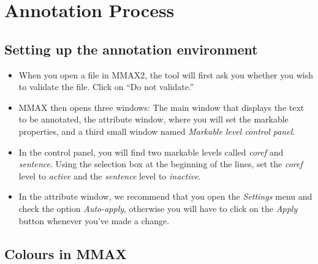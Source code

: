 \documentclass[a4paper]{article}
\begin{document}
% 
% 
% 



\section{Annotation Process}

\subsection{Setting up the annotation environment}

\begin{itemize}
\item When you open a file in MMAX2, the tool will first ask you whether you
wish to validate the file. Click on ``Do not validate.''
\item MMAX then opens three windows: The main window that displays the text to
be annotated, the attribute window, where you will set the markable properties,
and a third small window named
\emph{Markable level control panel}.
\item In the control panel, you will find two markable levels called
\emph{coref} and \emph{sentence}. Using the selection box at the beginning of
the lines, set the \emph{coref} level to \emph{active} and the \emph{sentence}
level to \emph{inactive}.
\item In the attribute window, we recommend that you open the \emph{Settings}
menu and check the option \emph{Auto-apply}, otherwise you will have to click on
the \emph{Apply} button whenever you've made a change.
\end{itemize}

\subsection{Colours in MMAX}
\end{document}
